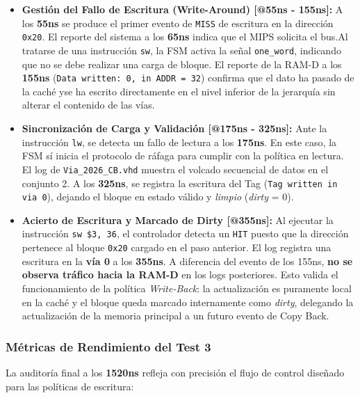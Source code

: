 \documentclass[12pt,a4paper]{article}
\begin{document}
\begin{itemize}
    \item \textbf{Gestión del Fallo de Escritura (Write-Around) [@55ns - 155ns]:} 
    A los \textbf{55ns} se produce el primer evento de \texttt{MISS} de escritura en la dirección \texttt{0x20}. El reporte del sistema a los \textbf{65ns} indica que el MIPS solicita el bus.Al tratarse de una instrucción \texttt{sw}, la FSM activa la señal \texttt{one\_word}, indicando que no se debe realizar una carga de bloque. El reporte de la RAM-D a los \textbf{155ns} (\texttt{Data written: 0, in ADDR = 32}) confirma que el dato ha pasado de la caché yse ha escrito directamente en el nivel inferior de la jerarquía sin alterar el contenido de las vías.

    \item \textbf{Sincronización de Carga y Validación [@175ns - 325ns]:} 
    Ante la instrucción \texttt{lw}, se detecta un fallo de lectura a los \textbf{175ns}. En este caso, la FSM sí inicia el protocolo de ráfaga para cumplir con la política en lectura. El log de \texttt{Via\_2026\_CB.vhd} muestra el volcado secuencial de datos en el conjunto 2. A los \textbf{325ns}, se registra la escritura del Tag (\texttt{Tag written in via 0}), dejando el bloque en estado válido y \textit{limpio} (\textit{dirty} = 0).

    \item \textbf{Acierto de Escritura y Marcado de Dirty [@355ns]:} 
    Al ejecutar la instrucción \texttt{sw \$3, 36}, el controlador detecta un \texttt{HIT} puesto que la dirección pertenece al bloque \texttt{0x20} cargado en el paso anterior. El log registra una escritura en la \textbf{vía 0} a los \textbf{355ns}. A diferencia del evento de los 155ns, \textbf{no se observa tráfico hacia la RAM-D} en los logs posteriores. Esto valida el funcionamiento de la política \textit{Write-Back}: la actualización es puramente local en la caché y el bloque queda marcado internamente como \textit{dirty}, delegando la actualización de la memoria principal a un futuro evento de Copy Back.
\end{itemize}

\subsubsection{Métricas de Rendimiento del Test 3}

La auditoría final a los \textbf{1520ns} refleja con precisión el flujo de control diseñado para las políticas de escritura:
\end{document}
